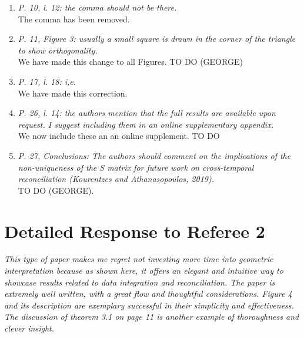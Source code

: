 \documentclass[a4paper,11pt]{article}
\begin{document}
\begin{enumerate}
	    \item \textit{P. 10, l. 12: the comma should not be there.}\\
	    
	    The comma has been removed.\\
	    
	    \item \textit{P. 11, Figure 3: usually a small square is drawn in the corner of the triangle to show orthogonality.}\\
	    
	    We have made this change to all Figures. TO DO (GEORGE)\\
	    
	    \item \textit{P. 17, l. 18: i,e.}\\
	    
	    We have made this correction.\\
	    
	    \item \textit{P. 26, l. 14: the authors mention that the full results are available upon request. I suggest including them in an online supplementary appendix.}\\
	    
	    We now include these an an online supplement. TO DO\\
	    
	    \item \textit{P. 27, Conclusions: The authors should comment on the implications of the non-uniqueness of the S matrix for future work on cross-temporal reconciliation (Kourentzes and Athanasopoulos, 2019).}\\
	    
	    TO DO (GEORGE).\\
	    
    \end{enumerate}

    \section*{Detailed Response to Referee 2}

	\noindent \textit{This type of paper makes me regret not investing more time into geometric interpretation because as shown here, it offers an elegant and intuitive way to showcase results related to data integration and reconciliation. The paper is extremely well written, with a great flow and thoughtful considerations. Figure 4 and its description are exemplary successful in their simplicity and effectiveness. The discussion of theorem 3.1 on page 11 is another example of thoroughness and clever insight.}\\
	
\end{document}
